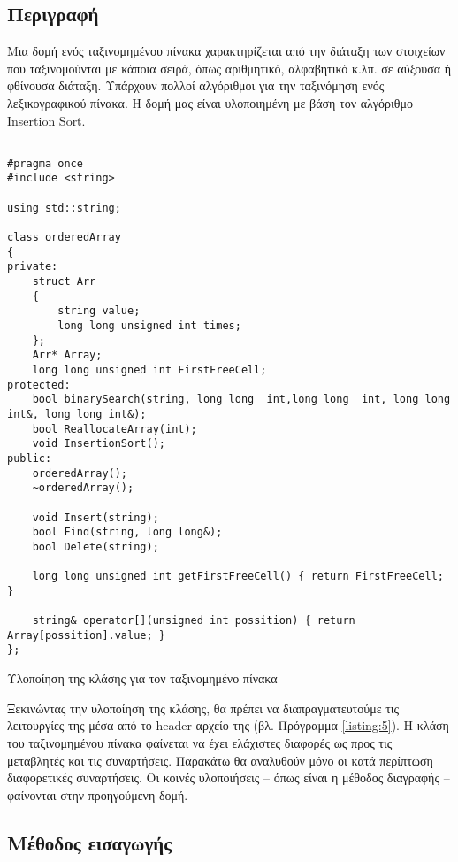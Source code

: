 \subsection*{Περιγραφή}

Μια δομή ενός ταξινομημένου πίνακα χαρακτηρίζεται από την διάταξη των στοιχείων που ταξινομούνται με κάποια σειρά, όπως αριθμητικό, αλφαβητικό κ.λπ. σε αύξουσα ή φθίνουσα διάταξη. Υπάρχουν πολλοί αλγόριθμοι για την ταξινόμηση ενός λεξικογραφικού πίνακα. Η δομή μας είναι υλοποιημένη με βάση τον αλγόριθμο \en Insertion Sort\gr.

\en
\begin{listing}[ht]
\begin{verbatim}

#pragma once
#include <string>

using std::string;

class orderedArray
{
private:
    struct Arr
    {
        string value;
        long long unsigned int times;
    };
    Arr* Array;
    long long unsigned int FirstFreeCell;
protected:
    bool binarySearch(string, long long  int,long long  int, long long int&, long long int&);
    bool ReallocateArray(int);
    void InsertionSort();
public:
    orderedArray();
    ~orderedArray();

    void Insert(string);
    bool Find(string, long long&);
    bool Delete(string);

    long long unsigned int getFirstFreeCell() { return FirstFreeCell; }

    string& operator[](unsigned int possition) { return Array[possition].value; }
};
\end{verbatim}
\caption{Υλοποίηση της κλάσης για τον ταξινομημένο πίνακα}
\label{listing:5}
\end{listing}

Ξεκινώντας την υλοποίηση της κλάσης, θα πρέπει να διαπραγματευτούμε τις λειτουργίες της μέσα από το \en header \gr αρχείο της (βλ. Πρόγραμμα \ref{listing:5}). Η κλάση του ταξινομημένου πίνακα φαίνεται να έχει ελάχιστες διαφορές ως προς τις μεταβλητές και τις συναρτήσεις. Παρακάτω θα αναλυθούν μόνο οι κατά περίπτωση διαφορετικές συναρτήσεις. Οι κοινές υλοποιήσεις -- όπως είναι η μέθοδος διαγραφής -- φαίνονται στην προηγούμενη δομή.

\subsection{Μέθοδος εισαγωγής}

